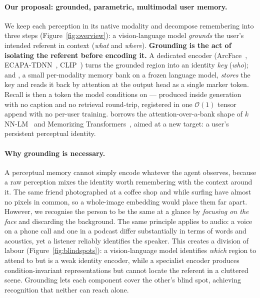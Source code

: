 \paragraph{Our proposal: grounded, parametric, multimodal user memory.} We keep each perception in its native modality and decompose remembering into three steps (Figure~\ref{fig:overview}): a vision-language model \emph{grounds} the user's intended referent in context (\emph{what} and \emph{where}). \textbf{Grounding is the act of isolating the referent before encoding it.} A dedicated encoder (ArcFace~\citep{arcface}, ECAPA-TDNN~\citep{ecapa}, CLIP~\citep{clip}) turns the grounded region into an identity \emph{key} (\emph{who}); and \attmem{}, a small per-modality memory bank on a frozen language model, \emph{stores} the key and reads it back by attention at the output head as a single marker token. Recall is then a token the model conditions on --- produced inside generation with no caption and no retrieval round-trip, registered in one $\mathcal{O}(1)$ tensor append with no per-user training. \attmem{} borrows the attention-over-a-bank shape of $k$NN-LM~\citep{khandelwal2020nearest} and Memorizing Transformers~\citep{wu2022memorizing}, aimed at a new target: a user's persistent perceptual identity.

\paragraph{Why grounding is necessary.} A perceptual memory cannot simply encode whatever the agent observes, because a raw perception mixes the identity worth remembering with the context around it. The same friend photographed at a coffee shop and while surfing have almost no pixels in common, so a whole-image embedding would place them far apart. However, we recognise the person to be the same at a glance by \emph{focusing on the face} and discarding the background. The same principle applies to audio: a voice on a phone call and one in a podcast differ substantially in terms of words and acoustics, yet a listener reliably identifies the speaker. This creates a division of labour (Figure~\ref{fig:blindspots}): a vision-language model identifies \emph{which} region to attend to but is a weak identity encoder, while a specialist encoder produces condition-invariant representations but cannot locate the referent in a cluttered scene. Grounding lets each component cover the other's blind spot, achieving recognition that neither can reach alone.

